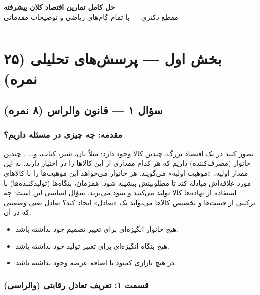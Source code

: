 \documentclass[12pt,a4paper]{article}
\begin{document}
\begin{center}
	{\Huge\bfseries\color{mainblue} حل کامل تمارین اقتصاد کلان پیشرفته}\\[0.5cm]
	{\large\color{darkgreen} مقطع دکتری — با تمام گام‌های ریاضی و توضیحات مقدماتی}\\[0.3cm]
	{\color{mainblue}\rule{\textwidth}{1.5pt}}
\end{center}

\tableofcontents
\newpage

\section{بخش اول — پرسش‌های تحلیلی (۲۵ نمره)}

\subsection{سؤال ۱ — قانون والراس (۸ نمره)}

\subsubsection{مقدمه: چه چیزی در مسئله داریم؟}

تصور کنید در یک اقتصاد بزرگ، چندین کالا وجود دارد: مثلاً نان، شیر، کتاب، و... . چندین خانوار (مصرف‌کننده) داریم که هر کدام مقداری از این کالاها را در اختیار دارند. به این مقدار اولیه، «موهبت اولیه» می‌گویند. هر خانوار می‌خواهد این موهبت‌ها را با کالاهای مورد علاقه‌اش مبادله کند تا مطلوبیتش بیشینه شود. همزمان، بنگاه‌ها (تولیدکننده‌ها) با استفاده از نهاده‌ها کالا تولید می‌کنند و سود می‌برند. سؤال اساسی این است: چه ترکیبی از قیمت‌ها و تخصیص کالاها می‌تواند یک «تعادل» ایجاد کند؟ تعادل یعنی وضعیتی که در آن:

\begin{itemize}
	\item هیچ خانوار انگیزه‌ای برای تغییر تصمیم خود نداشته باشد.
	\item هیچ بنگاه انگیزه‌ای برای تغییر تولید خود نداشته باشد.
	\item در هیچ بازاری کمبود یا اضافه عرضه وجود نداشته باشد.
\end{itemize}

\subsubsection{قسمت ۱: تعریف تعادل رقابتی (والراسی)}
\end{document}
